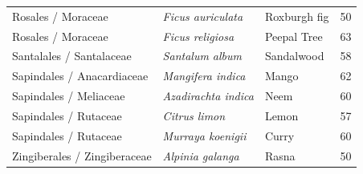 \begin{tabular}{lllr}
Rosales / Moraceae & \textit{Ficus auriculata} & Roxburgh fig & 50 \\
Rosales / Moraceae & \textit{Ficus religiosa} & Peepal Tree & 63 \\
Santalales / Santalaceae & \textit{Santalum album} & Sandalwood & 58 \\
Sapindales / Anacardiaceae & \textit{Mangifera indica} & Mango & 62 \\
Sapindales / Meliaceae & \textit{Azadirachta indica} & Neem & 60 \\
Sapindales / Rutaceae & \textit{Citrus limon} & Lemon & 57 \\
Sapindales / Rutaceae & \textit{Murraya koenigii} & Curry & 60 \\
Zingiberales / Zingiberaceae & \textit{Alpinia galanga} & Rasna & 50 \\
\bottomrule
\end{tabular}